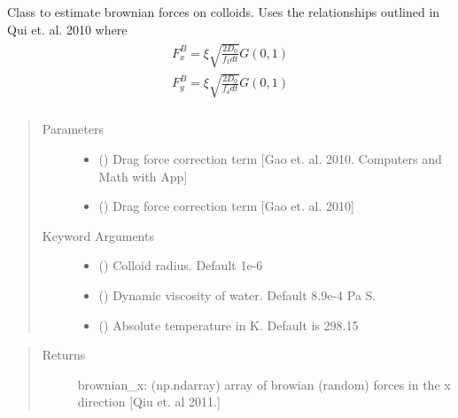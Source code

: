 \documentclass[letterpaper,10pt,english]{sphinxmanual}
\begin{document}
\begin{fulllineitems}
\label{\detokenize{index:lb_colloids.Colloids.Colloid_Math.Brownian}}
Class to estimate brownian forces on colloids. Uses the relationships outlined in Qui et. al. 2010
where
\begin{align*}\!\begin{aligned}
F_{x}^{B} = \xi \sqrt{\frac{2D_{0}}{f_{1}dt}}G(0,1)\\
F_{y}^{B} = \xi \sqrt{\frac{2D_{0}}{f_{4}dt}}G(0,1)\\
\end{aligned}\end{align*}\begin{quote}\begin{description}
\item[{Parameters}] \leavevmode\begin{itemize}
\item {} 
 () \textendash{} Drag force correction term {[}Gao et. al. 2010. Computers and Math with App{]}

\item {} 
 () \textendash{} Drag force correction term {[}Gao et. al. 2010{]}

\end{itemize}

\item[{Keyword Arguments}] \leavevmode\begin{itemize}
\item {} 
 () \textendash{} Colloid radius. Default 1e-6

\item {} 
 () \textendash{} Dynamic viscosity of water. Default 8.9e-4 Pa S.

\item {} 
 () \textendash{} Absolute temperature in K. Default is 298.15

\end{itemize}

\end{description}\end{quote}
\begin{quote}\begin{description}
\item[{Returns}] \leavevmode
brownian\_x: (np.ndarray) array of browian (random)
forces in the x direction {[}Qiu et. al 2011.{]}


\end{description}
\end{quote}
\end{fulllineitems}
\end{document}
